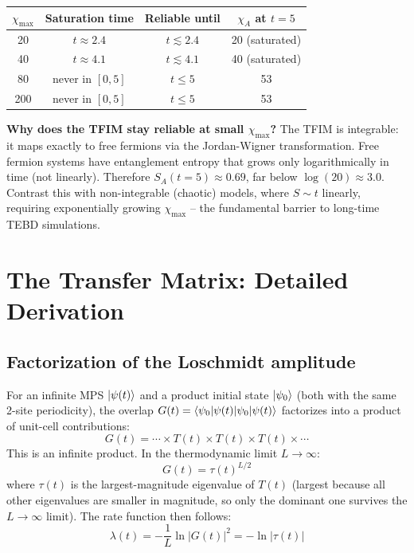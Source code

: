 \documentclass[11pt, a4paper]{article}
\begin{document}
\begin{center}
\begin{tabular}{cccc}
\toprule
$\chi_{\max}$ & Saturation time & Reliable until & $\chi_A$ at $t=5$ \\
\midrule
20  & $t \approx 2.4$ & $t \lesssim 2.4$ & 20 (saturated) \\
40  & $t \approx 4.1$ & $t \lesssim 4.1$ & 40 (saturated) \\
80  & never in $[0,5]$ & $t \leq 5$       & 53 \\
200 & never in $[0,5]$ & $t \leq 5$       & 53 \\
\bottomrule
\end{tabular}
\end{center}

\textbf{Why does the TFIM stay reliable at small $\chi_{\max}$?}
The TFIM is integrable: it maps exactly to free fermions via the Jordan-Wigner transformation. Free fermion systems have entanglement entropy that grows only logarithmically in time (not linearly). Therefore $S_A(t=5) \approx 0.69$, far below $\log(20) \approx 3.0$. Contrast this with non-integrable (chaotic) models, where $S \sim t$ linearly, requiring exponentially growing $\chi_{\max}$ -- the fundamental barrier to long-time TEBD simulations.

\section{The Transfer Matrix: Detailed Derivation}

\subsection{Factorization of the Loschmidt amplitude}

For an infinite MPS $\ket{\psi(t)}$ and a product initial state $\ket{\psi_0}$ (both with the same 2-site periodicity), the overlap $G(t) = \braket{\psi_0|\psi(t)}$ factorizes into a product of unit-cell contributions:
\begin{equation}
  G(t) = \cdots \times T(t) \times T(t) \times T(t) \times \cdots
\end{equation}
This is an infinite product. In the thermodynamic limit $L \to \infty$:
\begin{equation}
  G(t) = \tau(t)^{L/2}
\end{equation}
where $\tau(t)$ is the largest-magnitude eigenvalue of $T(t)$ (largest because all other eigenvalues are smaller in magnitude, so only the dominant one survives the $L \to \infty$ limit). The rate function then follows:
\begin{equation}
  \lambda(t) = -\frac{1}{L}\ln|G(t)|^2 = -\ln|\tau(t)|
\end{equation}
\end{document}
